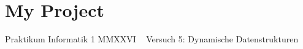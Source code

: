 \chapter{My Project}
\hypertarget{index}{}\label{index}
Praktikum Informatik 1 MMXXVI ~\newline
 Versuch 5\+: Dynamische Datenstrukturen 